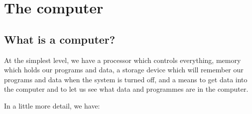 \chapter{The computer}

\section{What is a computer?}

At the simplest level, we have a processor which controls everything,
memory which holds our programs and data, a storage device which will
remember our programs and data when the system is turned off, and a means
to get data into the computer and to let us see what data and programmes
are in the computer.

In a little more detail, we have:

